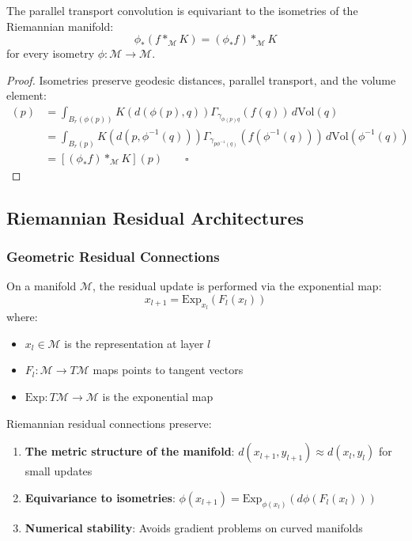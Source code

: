 \begin{theorem}
The parallel transport convolution is equivariant to
the isometries of the Riemannian manifold:
\[
\phi_*(f *_\mathcal{M} K) = (\phi_* f) *_\mathcal{M} K
\]
for every isometry \(\phi: \mathcal{M} \to \mathcal{M}\).
\end{theorem}

\begin{proof}
Isometries preserve geodesic distances, parallel transport, and the volume element:
\begin{align}
[(f *_\mathcal{M} K) \circ \phi](p) &= \int_{B_r(\phi(p))} K(d(\phi(p),q)) \Gamma_{\gamma_{\phi(p)q}}(f(q)) \, d\text{Vol}(q) \\
&= \int_{B_r(p)} K(d(p,\phi^{-1}(q))) \Gamma_{\gamma_{p\phi^{-1}(q)}}(f(\phi^{-1}(q))) \, d\text{Vol}(\phi^{-1}(q)) \\
&= [(\phi_* f) *_\mathcal{M} K](p) \qquad \square
\end{align}
\end{proof}

\subsection{Riemannian Residual Architectures}

\subsubsection{Geometric Residual Connections}

\begin{definition}
On a manifold \(\mathcal{M}\), the residual update is performed via the exponential map:
\[
x_{l+1} = \text{Exp}_{x_l}(F_l(x_l))
\]
where:
\begin{itemize}
	\item \(x_l \in \mathcal{M}\) is the representation at layer \(l\)
	\item \(F_l: \mathcal{M} \to T\mathcal{M}\) maps points to tangent vectors
	\item \(\text{Exp}: T\mathcal{M} \to \mathcal{M}\) is the exponential map
\end{itemize}
\end{definition}

\begin{theorem}
Riemannian residual connections preserve:
\begin{enumerate}
	\item \textbf{The metric structure of the manifold}: \(d(x_{l+1}, y_{l+1}) \approx d(x_l, y_l)\) for small updates
	\item \textbf{Equivariance to isometries}: \(\phi(x_{l+1}) = \text{Exp}_{\phi(x_l)}(d\phi(F_l(x_l)))\)
	\item \textbf{Numerical stability}: Avoids gradient problems on curved manifolds
\end{enumerate}
\end{theorem}

